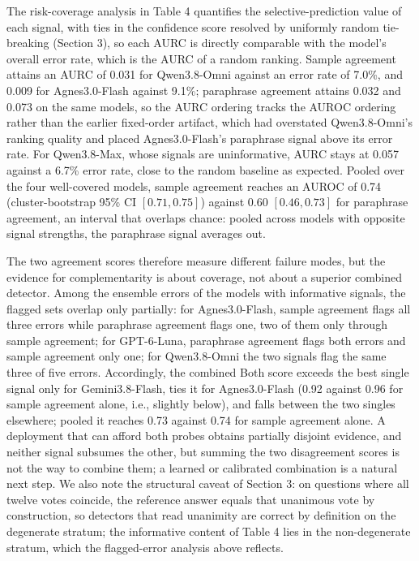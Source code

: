\documentclass[preprint,12pt]{elsarticle}
\begin{document}
The risk-coverage analysis in Table 4 quantifies the selective-prediction value of each signal, with ties in the confidence score resolved by uniformly random tie-breaking (Section 3), so each AURC is directly comparable with the model's overall error rate, which is the AURC of a random ranking. Sample agreement attains an AURC of 0.031 for Qwen3.8-Omni against an error rate of 7.0\%, and 0.009 for Agnes3.0-Flash against 9.1\%; paraphrase agreement attains 0.032 and 0.073 on the same models, so the AURC ordering tracks the AUROC ordering rather than the earlier fixed-order artifact, which had overstated Qwen3.8-Omni's ranking quality and placed Agnes3.0-Flash's paraphrase signal above its error rate. For Qwen3.8-Max, whose signals are uninformative, AURC stays at 0.057 against a 6.7\% error rate, close to the random baseline as expected. Pooled over the four well-covered models, sample agreement reaches an AUROC of 0.74 (cluster-bootstrap 95\% CI $[0.71, 0.75]$) against 0.60 $[0.46, 0.73]$ for paraphrase agreement, an interval that overlaps chance: pooled across models with opposite signal strengths, the paraphrase signal averages out.

The two agreement scores therefore measure different failure modes, but the evidence for complementarity is about coverage, not about a superior combined detector. Among the ensemble errors of the models with informative signals, the flagged sets overlap only partially: for Agnes3.0-Flash, sample agreement flags all three errors while paraphrase agreement flags one, two of them only through sample agreement; for GPT-6-Luna, paraphrase agreement flags both errors and sample agreement only one; for Qwen3.8-Omni the two signals flag the same three of five errors. Accordingly, the combined Both score exceeds the best single signal only for Gemini3.8-Flash, ties it for Agnes3.0-Flash (0.92 against 0.96 for sample agreement alone, i.e., slightly below), and falls between the two singles elsewhere; pooled it reaches 0.73 against 0.74 for sample agreement alone. A deployment that can afford both probes obtains partially disjoint evidence, and neither signal subsumes the other, but summing the two disagreement scores is not the way to combine them; a learned or calibrated combination is a natural next step. We also note the structural caveat of Section 3: on questions where all twelve votes coincide, the reference answer equals that unanimous vote by construction, so detectors that read unanimity are correct by definition on the degenerate stratum; the informative content of Table 4 lies in the non-degenerate stratum, which the flagged-error analysis above reflects.
\end{document}
